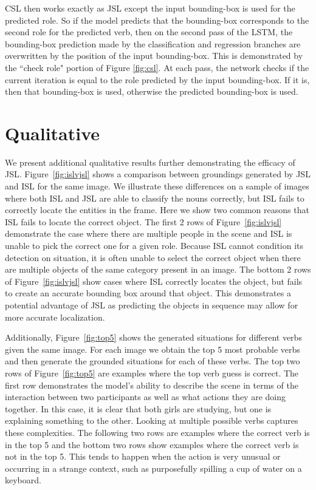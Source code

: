 \documentclass[runningheads]{llncs}
\begin{document}
CSL then works exactly as JSL except the input bounding-box is used for the predicted role. So if the model predicts that the bounding-box corresponds to the second role for the predicted verb, then on the second pass of the LSTM, the bounding-box prediction made by the classification and regression branches are overwritten by the position of the input bounding-box. This is demonstrated by the ``check role" portion of Figure \ref{fig:csl}. At each pass, the network checks if the current iteration is equal to the role predicted by the input bounding-box. If it is, then that bounding-box is used, otherwise the predicted bounding-box is used.  \section{Qualitative}
\label{sec:qual}

We present additional qualitative results further demonstrating the efficacy of JSL. Figure~\ref{fig:islvjsl} shows a comparison between groundings generated by JSL and ISL for the same image. We illustrate these differences on a sample of images where both ISL and JSL are able to classify the nouns correctly, but ISL fails to correctly locate the entities in the frame. Here we show two common reasons that ISL fails to locate the correct object. The first 2 rows of Figure~\ref{fig:islvjsl} demonstrate the case where there are multiple people in the scene and ISL is unable to pick the correct one for a given role. Because ISL cannot condition its detection on situation, it is often unable to select the correct object when there are multiple objects of the same category present in an image. The bottom 2 rows of Figure~\ref{fig:islvjsl} show cases where ISL correctly locates the object, but fails to create an accurate bounding box around that object. This demonstrates a potential advantage of JSL as predicting the objects in sequence may allow for more accurate localization.


Additionally, Figure~\ref{fig:top5} shows the generated situations for different verbs given the same image. For each image we obtain the top 5 most probable verbs and then generate the grounded situations for each of these verbs. The top two rows of Figure~\ref{fig:top5} are examples where the top verb guess is correct. The first row demonstrates the model's ability to describe the scene in terms of the interaction between two participants as well as what actions they are doing together. In this case, it is clear that both girls are studying, but one is explaining something to the other. Looking at multiple possible verbs captures these complexities. The following two rows are examples where the correct verb is in the top 5 and the bottom two rows show examples where the correct verb is not in the top 5. This tends to happen when the action is very unusual or occurring in a strange context, such as purposefully spilling a cup of water on a keyboard. 
\end{document}
